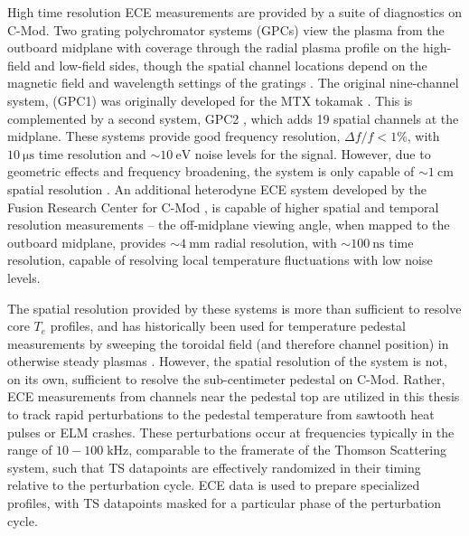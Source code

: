 High time resolution ECE measurements are provided by a suite of diagnostics on C-Mod.  Two grating polychromator systems (GPCs) view the plasma from the outboard midplane with coverage through the radial plasma profile on the high-field and low-field sides, though the spatial channel locations depend on the magnetic field and wavelength settings of the gratings \cite{Basse2007}.  The original nine-channel system, (GPC1) was originally developed for the MTX tokamak \cite{Guharay1990}.  This is complemented by a second system, GPC2 \cite{Taylor1998}, which adds 19 spatial channels at the midplane.  These systems provide good frequency resolution, $\Delta f/f < 1\%$, with $\SI{10}{\micro\second}$ time resolution and $\sim \SI{10}{\electronvolt}$ noise levels for the signal.  However, due to geometric effects and frequency broadening, the system is only capable of $\sim \SI{1}{\centi\meter}$ spatial resolution \cite{Basse2007}.  An additional heterodyne ECE system developed by the Fusion Research Center for C-Mod \cite{Heard1999,Chatterjee2001}, is capable of higher spatial and temporal resolution measurements -- the off-midplane viewing angle, when mapped to the outboard midplane, provides $\sim \SI{4}{\milli\meter}$ radial resolution, with $\sim \SI{100}{\nano\second}$ time resolution, capable of resolving local temperature fluctuations with low noise levels.

The spatial resolution provided by these systems is more than sufficient to resolve core $T_e$ profiles, and has historically been used for temperature pedestal measurements by sweeping the toroidal field (and therefore channel position) in otherwise steady plasmas \cite{Hubbard2001}.  However, the spatial resolution of the system is not, on its own, sufficient to resolve the sub-centimeter pedestal on C-Mod.  Rather, ECE measurements from channels near the pedestal top are utilized in this thesis to track rapid perturbations to the pedestal temperature from sawtooth heat pulses or ELM crashes.  These perturbations occur at frequencies typically in the range of $10-100 \;\si{\kilo\hertz}$, comparable to the framerate of the Thomson Scattering system, such that TS datapoints are effectively randomized in their timing relative to the perturbation cycle.  ECE data is used to prepare specialized profiles, with TS datapoints masked for a particular phase of the perturbation cycle.

%


